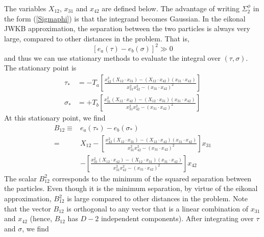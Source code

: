 The variables $X_{12}$, $x_{31}$ and $x_{42}$ are defined below. The advantage of writing $\Sigma_{2}^{\phi}$ in the form (\ref{Sigmaphi}) is that the integrand becomes Gaussian. In the eikonal JWKB approximation, the separation between the two particles is always very large, compared to other distances in the problem. That is,
\begin{equation}
	{\left[ e_{a}(\tau) - e_{b}(\sigma) \right]^{2} \gg 0 }
\end{equation}
and thus we can use stationary methods to evaluate the integral over $(\tau, \sigma)$. The stationary point is
\begin{equation}
\begin{split}
	\tau_{*} &= -T_{a} \left[ \frac{x_{42}^{2} \left( X_{12} \cdot x_{31} \right) - \left( X_{12} \cdot x_{42} \right) \left( x_{31} \cdot x_{42} \right)}{ x_{31}^{2} x_{42}^{2} - \left( x_{31} \cdot x_{42} \right)^{2} } \right] \\
	\sigma_{*} &= +T_{b} \left[ \frac{x_{31}^{2} \left( X_{12} \cdot x_{42} \right) - \left( X_{12} \cdot x_{31} \right) \left( x_{31} \cdot x_{42} \right)}{ x_{31}^{2} x_{42}^{2} - \left( x_{31} \cdot x_{42} \right)^{2} } \right]
\end{split} \label{TauSigmaStar}
\end{equation}
At this stationary point, we find
\begin{equation}
\begin{split}
	B_{12} \equiv {}& e_{a}(\tau_{*}) - e_{b}(\sigma_{*}) \\
	= {}& X_{12} - \left[ \frac{x_{42}^{2} \left( X_{12} \cdot x_{31} \right) - \left( X_{12} \cdot x_{42} \right) \left( x_{31} \cdot x_{42} \right)}{ x_{31}^{2} x_{42}^{2} - \left( x_{31} \cdot x_{42} \right)^{2} } \right] x_{31} \\
	&- \left[ \frac{x_{31}^{2} \left( X_{12} \cdot x_{42} \right) - \left( X_{12} \cdot x_{31} \right) \left( x_{31} \cdot x_{42} \right)}{ x_{31}^{2} x_{42}^{2} - \left( x_{31} \cdot x_{42} \right)^{2} } \right] x_{42}
\end{split}
\end{equation}
The scalar $B_{12}^{2}$ corresponds to the minimum of the squared separation between the particles. Even though it is the minimum separation, by virtue of the eikonal approximation, $B_{12}^{2}$ is large compared to other distances in the problem. Note that the vector $B_{12}$ is orthogonal to any vector that is a linear combination of $x_{31}$ and $x_{42}$ (hence, $B_{12}$ has $D-2$ independent components). After integrating over $\tau$ and $\sigma$, we find

